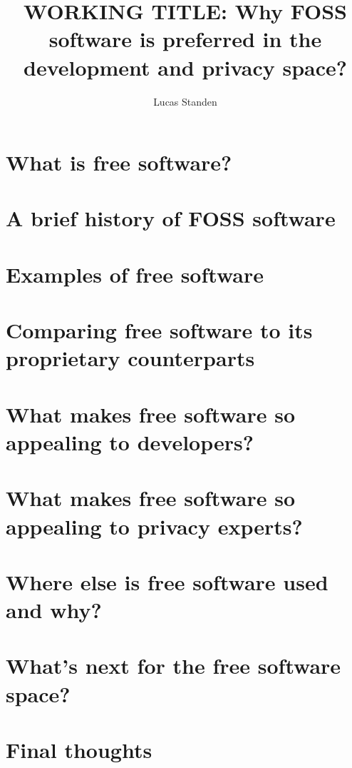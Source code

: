 \documentclass[a4paper,12pt]{article}
\author{Lucas Standen}
\title{WORKING TITLE: Why FOSS software is preferred in the 
development and privacy space?}
\begin{document}
\maketitle
\newpage
\tableofcontents
\newpage

{\setlength{\parindent}{0cm}

\section{What is free software?}
\section{A brief history of FOSS software}
\section{Examples of free software}
\section{Comparing free software to its proprietary counterparts}
\section{What makes free software so appealing to developers?}
\section{What makes free software so appealing to privacy experts?}
\section{Where else is free software used and why?}
\section{What's next for the free software space?}
\section{Final thoughts}

\newpage
\printbibliography
}
\end{document}
